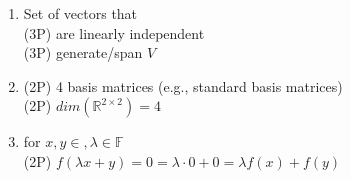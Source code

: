 {\color{solution}
\begin{enumerate}
	\item Set of vectors that\\
	\textcolor{exampoints}{(3P)} are linearly independent\\
	 \textcolor{exampoints}{(3P)} generate/span $V$
	\item  \textcolor{exampoints}{(2P)} 4 basis matrices (e.g., standard basis matrices)\\
	\textcolor{exampoints}{(2P)} $dim(\mathbb{R}^{2 \times 2}) = 4$
	\item for $x,y\in,\lambda\in\mathbb{F}$ \\
	\textcolor{exampoints}{(2P)} $  f(\lambda x + y) = 0 = \lambda \cdot 0 + 0 = \lambda f( x) + f(y)$
\end{enumerate}
}
